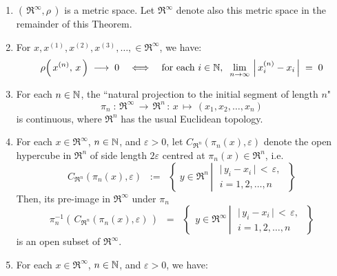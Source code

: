 \begin{theorem}
\mbox{}
\begin{enumerate}
\item	$\left(\,\Re^{\infty},\rho\,\right)$ is a metric space.
		Let $\Re^{\infty}$ denote also this metric space in the remainder of this Theorem.
\item	For $x, x^{(1)}, x^{(2)}, x^{(3)}, \ldots, \in \Re^{\infty}$, we have:
		\begin{equation*}
		\rho\!\left(\,x^{(n)},\,x\,\right) \; \longrightarrow \; 0
		\quad\Longleftrightarrow\quad
		\textnormal{for each $i \in \mathbb{N}$},\;\;
		\lim_{n\rightarrow\infty}\,\left\vert\,x^{(n)}_{i} - x_{i}\,\right\vert \; = \; 0
		\end{equation*}
\item	For each $n \in \mathbb{N}$, the ``natural projection to the initial segment of length $n$"
		\begin{equation*}
		\pi_{n} \; : \, \Re^{\infty} \,\longrightarrow\, \Re^{n} \, : \, x \,\longmapsto\, (x_{1},x_{2},\ldots,x_{n})
		\end{equation*}
		is continuous, where $\Re^{n}$ has the usual Euclidean topology.
\item	For each $x \in \Re^{\infty}$, $n \in \mathbb{N}$, and $\varepsilon > 0$,
		let $C_{\Re^{n}}(\pi_{n}(x),\varepsilon)$ denote the open hypercube in $\Re^{n}$
		of side length $2\varepsilon$ centred at $\pi_{n}(x) \in \Re^{n}$, i.e.
		\begin{equation*}
		C_{\Re^{n}}(\pi_{n}(x),\varepsilon)
		\;\; := \;\;
		\left\{\;
		y \in \Re^{n}
		\,\left\vert\;
		\begin{array}{c} \vert\,y_{i} - x_{i}\,\vert\,<\,\varepsilon,\\ i = 1, 2, \ldots, n\end{array}
		\right.		
		\;\right\}
		\end{equation*}
		Then, its pre-image in $\Re^{\infty}$ under $\pi_{n}$
		\begin{equation*}
		\pi_{n}^{-1}\!\left(\,C_{\Re^{n}}(\pi_{n}(x),\varepsilon)\,\right)
		\;\; = \;\;
		\left\{\;\,
		y \in \Re^{\infty}
		\,\left\vert\;
		\begin{array}{c} \vert\,y_{i} - x_{i}\,\vert\,<\,\varepsilon,\\ i = 1, 2, \ldots, n\end{array}
		\right.
		\;\right\}
		\end{equation*}
		is an open subset of $\Re^{\infty}$.
\item	For each $x \in \Re^{\infty}$, $n \in \mathbb{N}$, and $\varepsilon > 0$, we have:

\end{enumerate}
\end{theorem}
